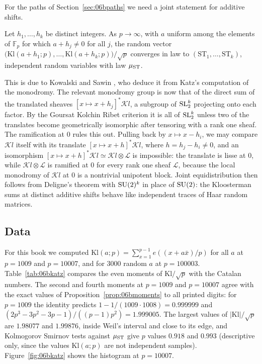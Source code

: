 For the paths of Section~\ref{sec:06bpaths} we need a joint statement for additive shifts.

\begin{theorem}\label{thm:06bjoint}
Let $h_1,\dots,h_k$ be distinct integers. As $p\to\infty$, with $a$ uniform among the elements of $\mathbb{F}_p$ for which $a+h_j\ne0$ for all $j$, the random vector $\bigl(\mathrm{Kl}(a+h_1;p),\dots,\mathrm{Kl}(a+h_k;p)\bigr)/\sqrt p$ converges in law to $(\mathrm{ST}_1,\dots,\mathrm{ST}_k)$, independent random variables with law $\mu_{\mathrm{ST}}$.
\end{theorem}

This is due to Kowalski and Sawin \cite{kowalskisawin2016}, who deduce it from Katz's computation of the monodromy. The relevant monodromy group is now that of the direct sum of the translated sheaves $[x\mapsto x+h_j]^*\mathcal{K}l$, a subgroup of $\mathrm{SL}_2^k$ projecting onto each factor. By the Goursat Kolchin Ribet criterion \cite{katz1990} it is all of $\mathrm{SL}_2^k$ unless two of the translates become geometrically isomorphic after tensoring with a rank one sheaf. The ramification at $0$ rules this out. Pulling back by $x\mapsto x-h_i$, we may compare $\mathcal{K}l$ itself with its translate $[x\mapsto x+h]^*\mathcal{K}l$, where $h=h_j-h_i\neq0$, and an isomorphism $[x\mapsto x+h]^*\mathcal{K}l\simeq\mathcal{K}l\otimes\mathcal{L}$ is impossible: the translate is lisse at $0$, while $\mathcal{K}l\otimes\mathcal{L}$ is ramified at $0$ for every rank one sheaf $\mathcal{L}$, because the local monodromy of $\mathcal{K}l$ at $0$ is a nontrivial unipotent block. Joint equidistribution then follows from Deligne's theorem with $\mathrm{SU}(2)^k$ in place of $\mathrm{SU}(2)$: the Kloosterman sums at distinct additive shifts behave like independent traces of Haar random matrices.

\subsection{Data}

For this book we computed $\mathrm{Kl}(a;p)=\sum_{x=1}^{p-1}e((x+a\bar x)/p)$ for all $a$ at $p=1009$ and $p=10007$, and for $3000$ random $a$ at $p=100003$. Table~\ref{tab:06bkatz} compares the even moments of $\mathrm{Kl}/\sqrt p$ with the Catalan numbers. The second and fourth moments at $p=1009$ and $p=10007$ agree with the exact values of Proposition~\ref{prop:06bmoments} to all printed digits: for $p=1009$ the identity predicts $1-1/(1009\cdot1008)=0.999999$ and $(2p^3-3p^2-3p-1)/((p-1)p^2)=1.999005$. The largest values of $|\mathrm{Kl}|/\sqrt p$ are $1.98077$ and $1.99876$, inside Weil's interval and close to its edge, and Kolmogorov Smirnov tests against $\mu_{\mathrm{ST}}$ give $p$ values $0.918$ and $0.993$ (descriptive only, since the values $\mathrm{Kl}(a;p)$ are not independent samples). Figure~\ref{fig:06bkatz} shows the histogram at $p=10007$.


